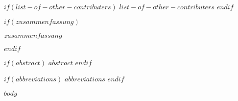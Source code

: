 \documentclass[11pt, a4paper, twosided]{book}
\begin{document}
$if(list-of-other-contributers)$
    $list-of-other-contributers$
\newpage\null\newpage
$endif$



$if(zusammenfassung)$
\begin{sloppypar}
    $zusammenfassung$
\end{sloppypar}
$endif$



\newpage\null\newpage


$if(abstract)$
    $abstract$
$endif$
\newpage\null\newpage

\newpage
\tableofcontents
\clearpage

$if(abbreviations)$
\newpage
$abbreviations$
$endif$



\newpage
\pagestyle{plain} %
\setcounter{page}{1}    %

$body$
\end{document}
